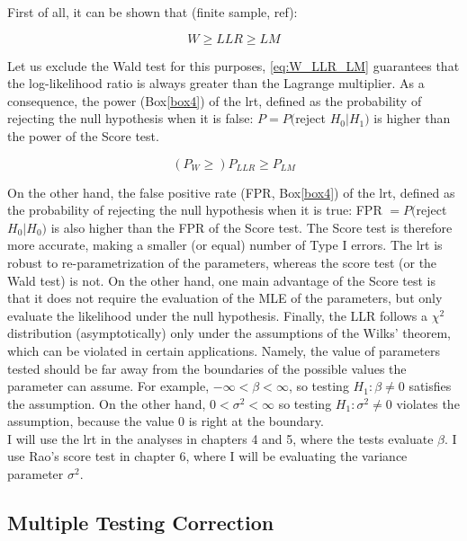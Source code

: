 First of all, it can be shown that (finite sample, ref):

\begin{equation}\label{eq:W_LLR_LM}
    W \geq LLR \geq LM
\end{equation}

Let us exclude the Wald test for this purposes, \eqref{eq:W_LLR_LM} guarantees that the log-likelihood ratio is always greater than the Lagrange multiplier.
As a consequence, the power (Box\ref{box4}) of the \gls{lrt}, defined as the probability of rejecting the null hypothesis when it is false: $P = P($reject $H_0 | H_1)$ is higher than the power of the Score test.

\begin{equation}
    (P_W \geq) P_{LLR} \geq P_{LM}
\end{equation}

On the other hand, the false positive rate (FPR, Box\ref{box4}) of the \gls{lrt}, defined as the probability of rejecting the null hypothesis when it is true: FPR $= P($reject $H_0 | H_0)$ is also higher than the FPR of the Score test.
The Score test is therefore more accurate, making a smaller (or equal) number of Type I errors. The \gls{lrt} is robust to re-parametrization of the parameters, whereas the score test (or the Wald test) is not. On the other hand, one main advantage of the Score test is that it does not require the evaluation of the MLE of the parameters, but only evaluate the likelihood under the null hypothesis.
Finally, the LLR follows a $\chi^2$ distribution (asymptotically) only under the assumptions of the Wilks' theorem, which can be violated in certain applications.
Namely, the value of parameters tested should be far away from the boundaries of the possible values the parameter can assume.
For example, $-\infty < \beta < \infty$, so testing $H_1: \beta \neq 0$ satisfies the assumption.
On the other hand, $0 < \sigma^2 < \infty$ so testing $H_1: \sigma^2 \neq 0$ violates the assumption, because the value $0$ is right at the boundary.\\

I will use the \gls{lrt} in the analyses in chapters 4 and 5, where the tests evaluate $\beta$.
I use Rao's score test in chapter 6, where I will be evaluating the variance parameter $\sigma^2$.


\subsection{Multiple Testing Correction}

